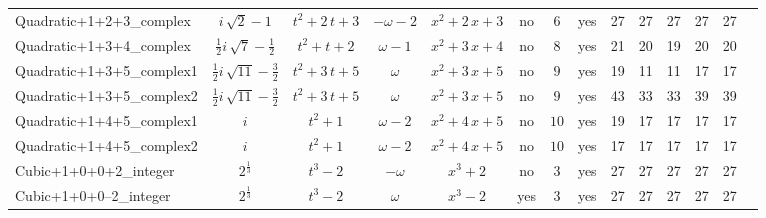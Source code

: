 \begin{tabular}{l|c c c c|ccc|c c  c  c  c  c  }
Quadratic+1+2+3\_complex & $ i \, \sqrt{2} - 1 $ & $ t^{2} + 2 \, t + 3 $ & $ -\omega - 2 $ & $ x^{2} + 2 \, x + 3 $ & no & $ 6 $ & yes & 27 & 27 & 27 & 27 & 27 \\
Quadratic+1+3+4\_complex & $ \frac{1}{2} i \, \sqrt{7} - \frac{1}{2} $ & $ t^{2} + t + 2 $ & $ \omega - 1 $ & $ x^{2} + 3 \, x + 4 $ & no & $ 8 $ & yes & 21 & 20 & 19 & 20 & 20 \\
Quadratic+1+3+5\_complex1 & $ \frac{1}{2} i \, \sqrt{11} - \frac{3}{2} $ & $ t^{2} + 3 \, t + 5 $ & $ \omega $ & $ x^{2} + 3 \, x + 5 $ & no & $ 9 $ & yes & 19 & 11 & 11 & 17 & 17 \\
Quadratic+1+3+5\_complex2  & $ \frac{1}{2} i \, \sqrt{11} - \frac{3}{2} $ & $ t^{2} + 3 \, t + 5 $ & $ \omega $ & $ x^{2} + 3 \, x + 5 $ & no & $ 9 $ & yes & 43 & 33 & 33 & 39 & 39 \\
Quadratic+1+4+5\_complex1 & $ i $ & $ t^{2} + 1 $ & $ \omega - 2 $ & $ x^{2} + 4 \, x + 5 $ & no & $ 10 $ & yes & 19 & 17 & 17 & 17 & 17 \\
Quadratic+1+4+5\_complex2 & $ i $ & $ t^{2} + 1 $ & $ \omega - 2 $ & $ x^{2} + 4 \, x + 5 $ & no & $ 10 $ & yes & 17 & 17 & 17 & 17 & 17 \\
Cubic+1+0+0+2\_integer & $ 2^{\frac{1}{3}} $ & $ t^{3} - 2 $ & $ -\omega $ & $ x^{3} + 2 $ & no & $ 3 $ & yes & 27 & 27 & 27 & 27 & 27 \\
Cubic+1+0+0--2\_integer & $ 2^{\frac{1}{3}} $ & $ t^{3} - 2 $ & $ \omega $ & $ x^{3} - 2 $ & yes & $ 3 $ & yes & 27 & 27 & 27 & 27 & 27 \\
\end{tabular}
